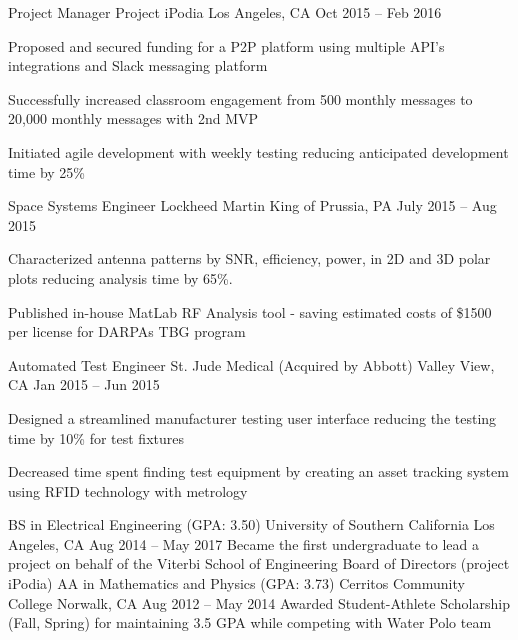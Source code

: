 \documentclass[]{awesome-cv}
\begin{document}
\begin{cventries}
	\cventry
	{Project Manager}
	{Project iPodia}
	{Los Angeles, CA}
	{Oct 2015 – Feb 2016}
	{\begin{cvitems}
		\item {Proposed and secured funding for a P2P platform using multiple API’s integrations and Slack messaging platform}
		\item {Successfully increased classroom engagement from 500 monthly messages to 20,000 monthly messages with 2nd MVP}
		\item {Initiated agile development with weekly testing reducing anticipated development time by 25\%}
		\end{cvitems}}
	\cventry
	{Space Systems Engineer}
	{Lockheed Martin}
	{King of Prussia, PA}
	{July 2015 – Aug 2015}
	{\begin{cvitems}
		\item {Characterized antenna patterns by SNR, efficiency, power, in 2D and 3D polar plots reducing analysis time by 65\%.}
		\item {Published in-house MatLab RF Analysis tool - saving estimated costs of \$1500 per license for DARPA\textquotesingle{}s TBG program}
		\end{cvitems}}
	\cventry
	{Automated Test Engineer}
	{St. Jude Medical (Acquired by Abbott)}
	{Valley View, CA}
	{Jan 2015 – Jun 2015}
	{\begin{cvitems}
		\item {Designed a streamlined manufacturer testing user interface reducing the testing time by 10\% for test fixtures}
		\item {Decreased time spent finding test equipment by creating an asset tracking system using RFID technology with metrology}
		\end{cvitems}}
\end{cventries}
\vspace{-5mm}
\begin{cventries}
	\cventry
	{BS in Electrical Engineering (GPA: 3.50)}
	{University of Southern California}
	{Los Angeles, CA}
	{Aug 2014 – May 2017}
	{Became the first undergraduate to lead a project on behalf of the Viterbi School of Engineering Board of Directors (project iPodia)}
	\cventry
	{AA in Mathematics and Physics (GPA: 3.73)}
	{Cerritos Community College}
	{Norwalk, CA}
	{Aug 2012 – May 2014}
	{Awarded Student-Athlete Scholarship (Fall, Spring) for maintaining 3.5 GPA while competing with Water Polo team}
\end{cventries}
\end{document}
